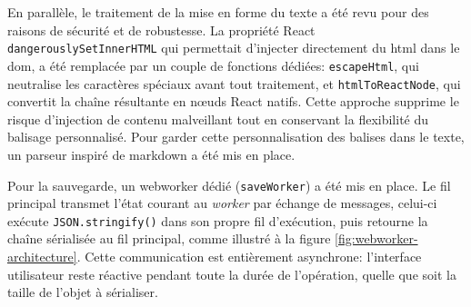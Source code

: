 En parallèle, le traitement de la mise en forme du texte a été revu pour des raisons de sécurité et de robustesse. La propriété React \texttt{dangerouslySetInnerHTML} qui permettait d'injecter directement du \acrshort{html} dans le \acrshort{dom}, a été remplacée par un couple de fonctions dédiées: \texttt{escapeHtml}, qui neutralise les caractères spéciaux avant tout traitement, et \texttt{htmlToReactNode}, qui convertit la chaîne résultante en n\oe{}uds React natifs. Cette approche supprime le risque d'injection de contenu malveillant tout en conservant la flexibilité du balisage personnalisé. Pour garder cette personnalisation des balises dans le texte, un \gls{parseur} inspiré de \gls{markdown} a été mis en place.

Pour la sauvegarde, un \gls{webworker} dédié (\texttt{saveWorker}) a été mis en place. Le fil principal transmet l'état courant au \textit{worker} par échange de messages, celui-ci exécute \texttt{JSON.stringify()} dans son propre fil d'exécution, puis retourne la chaîne sérialisée au fil principal, comme illustré à la figure \ref{fig:webworker-architecture}. Cette communication est entièrement asynchrone: l'interface utilisateur reste réactive pendant toute la durée de l'opération, quelle que soit la taille de l'objet à sérialiser.

